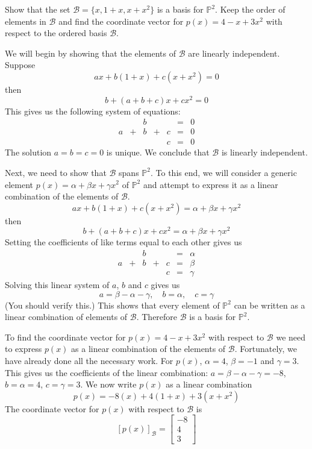 \documentclass{ximera}
\begin{document}
\begin{example}\label{ex:coordvectorinpolyvectspace2}
Show that the set $\mathcal{B}=\{x, 1+x, x+x^2\}$ is a basis for $\mathbb{P}^2$. Keep the order of elements in $\mathcal{B}$ and find the coordinate vector for $p(x)=4-x+3x^2$ with respect to the ordered basis $\mathcal{B}$.
\begin{explanation}
We will begin by showing that the elements of $\mathcal{B}$ are linearly independent.  Suppose 
$$ax+b(1+x)+c(x+x^2)=0$$
then
$$b+(a+b+c)x+cx^2=0$$
This gives us the following system of equations:
$$\begin{array}{ccccccc}
     & &b&&&=&0\\
     a & +&b&+&c&= &0 \\
	 & &&&c&=&0
     \end{array}$$
The solution $a=b=c=0$ is unique.  We conclude that $\mathcal{B}$ is linearly independent.

Next, we need to show that $\mathcal{B}$ spans $\mathbb{P}^2$.  To this end, we will consider a generic element $p(x)=\alpha+\beta x+\gamma x^2$ of $\mathbb{P}^2$ and attempt to express it as a linear combination of the elements of $\mathcal{B}$.
$$ax+b(1+x)+c(x+x^2)=\alpha+\beta x+\gamma x^2$$
then
$$b+(a+b+c)x+cx^2=\alpha+\beta x+\gamma x^2$$
Setting the coefficients of like terms equal to each other gives us
$$\begin{array}{ccccccc}
     & &b&&&=&\alpha\\
     a & +&b&+&c&= &\beta \\
	 & &&&c&=&\gamma
     \end{array}$$
Solving this linear system of $a$, $b$ and $c$ gives us
$$a=\beta-\alpha-\gamma,\quad b=\alpha,\quad c=\gamma$$
(You should verify this.)  This shows that every element of $\mathbb{P}^2$ can be written as a linear combination of elements of $\mathcal{B}$.  Therefore $\mathcal{B}$ is a basis for $\mathbb{P}^2$.

To find the coordinate vector for $p(x)=4-x+3x^2$ with respect to $\mathcal{B}$ we need to express $p(x)$ as a linear combination of the elements of $\mathcal{B}$.  Fortunately, we have already done all the necessary work.  For $p(x)$, $\alpha=4$, $\beta=-1$ and $\gamma=3$.  This gives us the coefficients of the linear combination: $a=\beta-\alpha-\gamma=-8$, $b=\alpha=4$, $c=\gamma=3$.  We now write $p(x)$ as a linear combination
$$p(x)=-8(x)+4(1+x)+3(x+x^2)$$
The coordinate vector for $p(x)$ with respect to $\mathcal{B}$ is
$$[p(x)]_{\mathcal{B}}=\begin{bmatrix}-8\\4\\3\end{bmatrix}$$
\end{explanation}
\end{example}
\end{document}
